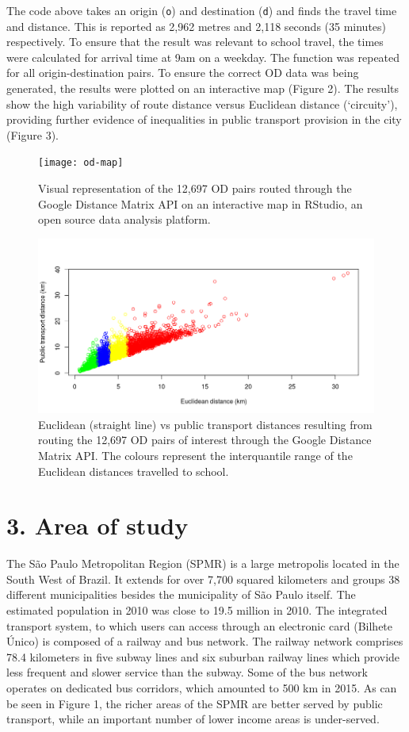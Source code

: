 \documentclass[]{article}
\begin{document}
The code above takes an origin (\texttt{o}) and destination (\texttt{d})
and finds the travel time and distance. This is reported as 2,962 metres
and 2,118 seconds (35 minutes) respectively. To ensure that the result
was relevant to school travel, the times were calculated for arrival
time at 9am on a weekday. The function was repeated for all
origin-destination pairs. To ensure the correct OD data was being
generated, the results were plotted on an interactive map (Figure 2).
The results show the high variability of route distance versus Euclidean
distance (`circuity'), providing further evidence of inequalities in
public transport provision in the city (Figure 3).
\begin{figure}
\texttt{[image: od-map]} \caption{Visual representation of the 12,697 OD pairs routed through the Google Distance Matrix API on an interactive map in RStudio, an open source data analysis platform.}\label{fig:unnamed-chunk-4}
\end{figure}
\begin{figure}
\includegraphics[width=1\linewidth]{public-vs-euclid-dists} \caption{Euclidean (straight line) vs public transport distances resulting from routing the 12,697 OD pairs of interest through the Google Distance Matrix API. The colours represent the interquantile range of the Euclidean distances travelled to school.}\label{fig:euclid}
\end{figure}

\section{3. Area of study}\label{area-of-study}

The São Paulo Metropolitan Region (SPMR) is a large metropolis located
in the South West of Brazil. It extends for over 7,700 squared
kilometers and groups 38 different municipalities besides the
municipality of São Paulo itself. The estimated population in 2010 was
close to 19.5 million in 2010. The integrated transport system, to which
users can access through an electronic card (Bilhete Único) is composed
of a railway and bus network. The railway network comprises 78.4
kilometers in five subway lines and six suburban railway lines which
provide less frequent and slower service than the subway. Some of the
bus network operates on dedicated bus corridors, which amounted to 500
km in 2015. As can be seen in Figure 1, the richer areas of the SPMR are
better served by public transport, while an important number of lower
income areas is under-served.
\end{document}
